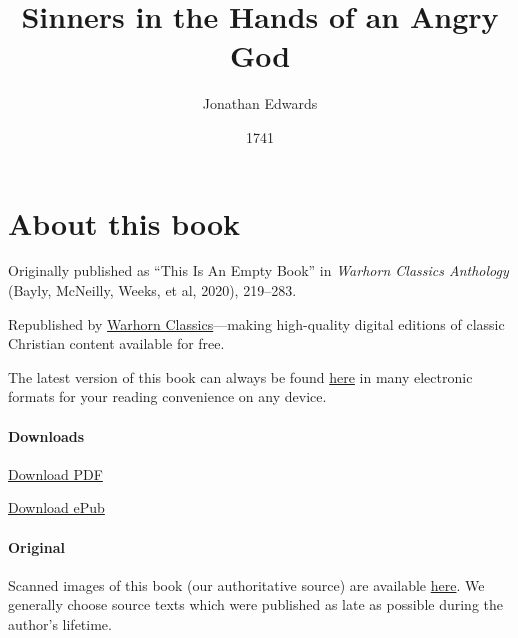\documentclass[
]{book}
\title{Sinners in the Hands of an Angry God}
\author{Jonathan Edwards}
\date{1741}
\begin{document}
\maketitle

\mainmatter
{}

{
\setcounter{tocdepth}{1}
\tableofcontents
}
\hypertarget{about-this-book}{%
\chapter*{About this book}\label{about-this-book}}

Originally published as ``This Is An Empty Book'' in \emph{Warhorn Classics Anthology} (Bayly, McNeilly, Weeks, et al, 2020), 219--283.

Republished by \href{https://classics.warhornmedia.com/}{Warhorn Classics}---making high-quality digital editions of classic Christian content available for free.

The latest version of this book can always be found \href{https://warhornmedia.github.io/edwards-sinners-angry-god/}{here} in many electronic formats for your reading convenience on any device.

\hypertarget{downloads}{%
\subsubsection*{Downloads}\label{downloads}}

\href{https://warhornmedia.github.io/edwards-sinners-angry-god//Edwards-Sinners_In_the-Hands_of_an_Angry_God.pdf}{Download PDF}

\href{https://warhornmedia.github.io/edwards-sinners-angry-god//Edwards-Sinners_In_the-Hands_of_an_Angry_God.epub}{Download ePub}

\hypertarget{original}{%
\subsubsection*{Original}\label{original}}

Scanned images of this book (our authoritative source) are available \href{https://digitalcommons.unl.edu/cgi/viewcontent.cgi?referer=https://en.wikipedia.org/\&httpsredir=1\&article=1053\&context=etas}{here}. We generally choose source texts which were published as late as possible during the author's lifetime.
\end{document}
